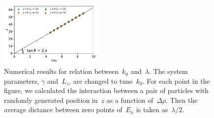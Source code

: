 \documentclass[aps,prl,reprint,showpacs,floatfix,superscriptaddress]{revtex4-2}
\newcommand{\D}[1]{\Delta#1} %
\begin{document}
\begin{figure}[htbp]
    \centering
    \includegraphics[width=0.45\textwidth]{SIfig/k_wavelegth.pdf}
    \caption{
        Numerical results for relation between~$k_0$ and~$\lambda$.
        The system parameters, $\gamma$ and~$L_z$, are changed to tune~$k_0$.
        For each point in the figure, we calculated the interaction between a pair of particles with randomly generated position in~$z$ as a function of~$\D \rho$.
        Then the average distance between zero points of~$E_x$ is taken as~$\lambda / 2$.
    }
    \label{fig:k_wavelegth}
\end{figure}
\end{document}
